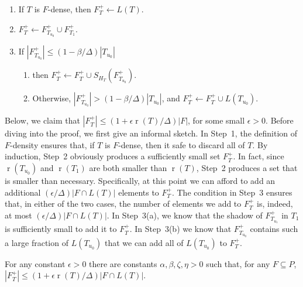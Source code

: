 \documentclass{patmorin}
\DeclareMathOperator{\rank}{r}
\begin{document}
\begin{enumerate}
  \item If $T$ is $F$-dense, then $F^+_T\gets L(T)$. 
  \item $F^+_T\gets F^+_{T_{u_0}}\cup F^+_{T_1}$. 
  \item If $|F^+_{T_{u_0}}|\le (1-\beta/\Delta)|T_{u_0}|$
  \begin{enumerate}
     \item then $F^+_T\gets F^+_T\cup S_{H_T}(F^+_{T_{u_0}})$. 
     \item Otherwise, $|F^+_{T_{u_0}}|> (1-\beta/\Delta)|T_{u_0}|$,
          and $F^+_T\gets F^+_T\cup L(T_{u_0})$.
  \end{enumerate}
\end{enumerate}

Below, we claim that $|F^+_T|\le (1+\epsilon \rank(T)/\Delta)|F|$, for
some small $\epsilon >0$.  Before diving into the proof, we first give an
informal sketch.  In Step~1, the definition of $F$-density ensures that,
if $T$ is $F$-dense, then it safe to discard all of $T$.  By induction,
Step~2 obviously produces a sufficiently small set $F^+_T$.  In fact,
since $\rank(T_{u_0})$ and $\rank(T_1)$ are both smaller than $\rank(T)$,
Step~2 produces a set that is smaller than necessary. Specifically, at this
point we can afford to add an additional $(\epsilon/\Delta)|F\cap L(T)|$
elements to $F^+_T$.  The condition in Step~3 ensures that, in either
of the two cases, the number of elements we add to $F^+_T$ is, indeed,
at most $(\epsilon/\Delta)|F\cap L(T)|$.  In Step~3(a), we know that
the shadow of $F^+_{T_{u_1}}$ in $T_1$ is sufficiently small to add it
to $F^+_T$.  In Step~3(b) we know that $F^+_{T_{u_0}}$ contains such
a large fraction of $L(T_{u_0})$ that we can add all of $L(T_{u_0})$ to $F^+_T$.

\begin{clm}
   For any constant $\epsilon>0$ there are constants
   $\alpha,\beta,\zeta,\eta >0$ such that, for any $F\subseteq P$,
   $|F^+_T| \le (1+\epsilon\rank(T)/\Delta)|F\cap L(T)|$.
\end{clm}
\end{document}
